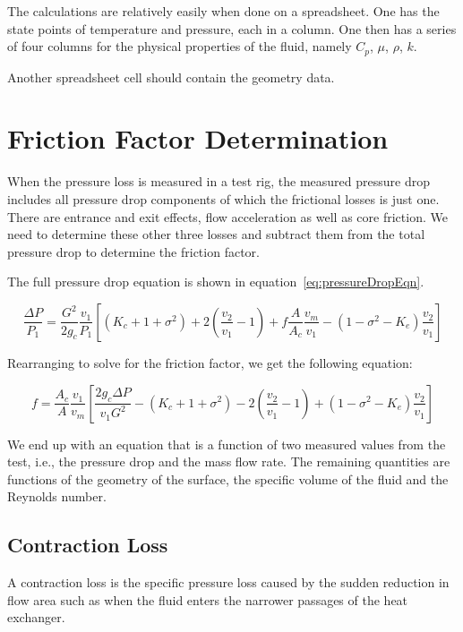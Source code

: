 \documentclass[12pt]{article}
\begin{document}
The calculations are relatively easily when done on a spreadsheet.
One has the state points of temperature and pressure, each in a column. One then has a series of four columns for the physical properties of the fluid, namely $C_p$, $\mu$, $\rho$, $k$.

Another spreadsheet cell should contain the geometry data.



\section{Friction Factor Determination}
When the pressure loss is measured in a test rig, the measured pressure drop includes all pressure drop components of which the frictional losses is just one. There are entrance and exit effects, flow acceleration as well as core friction. We need to determine these other three losses and subtract them from the total pressure drop to determine the friction factor.

The full pressure drop equation is shown in equation~\eqref{eq:pressureDropEqn}.

\begin{equation}		
	\frac{\Delta P}{P_1}=\frac{G^2}{2g_c} \frac {v_1}{P_1} \left[(K_c+1+\sigma^2) +2\left(\frac{v_2}{v_1}-1\right) + 
	f \frac{A}{A_c}  \frac{v_m}{v_1} - (1-\sigma^2-K_e)\frac{v_2}{v_1}  \right]
	\label{eq:pressureDropEqn}		
\end{equation}

Rearranging to solve for the friction factor, we get the following equation:

\begin{equation}
	f = \frac{A_c}{A}\frac{v_1}{v_m} \left[ \frac{2g_c \Delta P}{v_1 G^2} -(K_c+1+\sigma^2)-2\left(\frac{v_2}{v_1}-1\right)+(1-\sigma^2-K_e)\frac{v_2}{v_1}\right]
\end{equation}	

We end up with an equation that is a function of two measured values from the test, i.e., the pressure drop and the mass flow rate. The remaining quantities are functions of the geometry of the surface, the specific volume of the fluid and the Reynolds number.

\subsection{Contraction Loss}
A contraction loss is the specific pressure loss caused by the sudden reduction in flow area such as when the fluid enters the narrower passages of the heat exchanger. 
\end{document}
